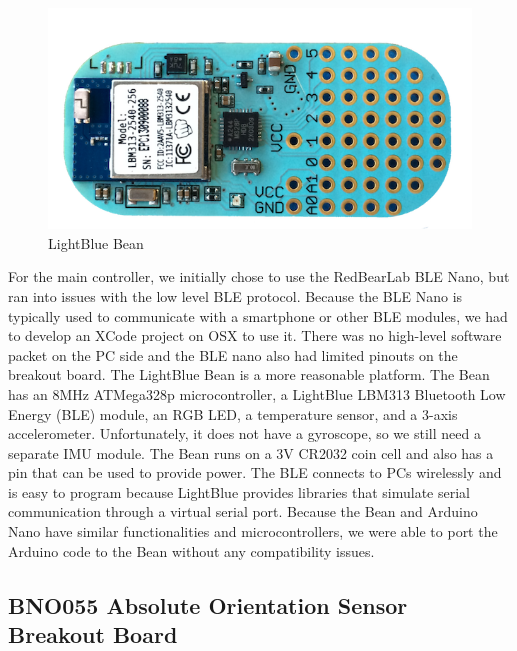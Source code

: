 \documentclass[12pt,journal]{IEEEtran}
\begin{document}
\begin{figure}[H]
    \includegraphics[width=0.8\linewidth]{figures/bean}
  \caption{LightBlue Bean}
  \label{fig:bean}
\end{figure}

For the main controller, we initially chose to use the RedBearLab BLE Nano, but ran into issues with the low level BLE protocol. Because the BLE Nano is typically used to communicate with a smartphone or other BLE modules, we had to develop an XCode project on OSX to use it. There was no high-level software packet on the PC side and the BLE nano also had limited pinouts on the breakout board.
The LightBlue Bean is a more reasonable platform. The Bean has an 8MHz ATMega328p microcontroller, a LightBlue LBM313 Bluetooth Low Energy (BLE) module, an RGB LED, a temperature sensor, and a 3-axis accelerometer. Unfortunately, it does not have a gyroscope, so we still need a separate IMU module. The Bean runs on a 3V CR2032 coin cell and also has a pin that can be used to provide power. The BLE connects to PCs wirelessly and is easy to program because LightBlue provides libraries that simulate serial communication through a virtual serial port. Because the Bean and Arduino Nano have similar functionalities and microcontrollers, we were able to port the Arduino code to the Bean without any compatibility issues.

\subsection{BNO055 Absolute Orientation Sensor Breakout Board}
\end{document}
